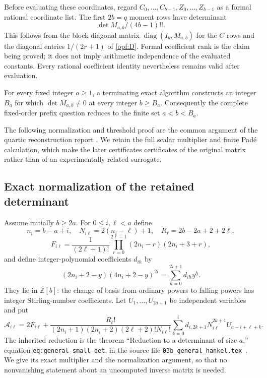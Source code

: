 Before evaluating these coordinates, regard
$C_0,\ldots,C_{b-1},Z_0,\ldots,Z_{b-1}$ as a formal rational
coordinate list. The first $2b=q$ moment rows have determinant
\begin{equation}\label{opf:prefix-determinant}
 \det M_{a,b}/(4b-1)!!.
\end{equation}
This follows from the block diagonal matrix $\operatorname{diag}(I_b,M_{a,b})$
for the $C$ rows and the diagonal entries $1/(2r+1)$ of
\eqref{opf:D}. Formal coefficient rank is the claim being proved;
it does not imply arithmetic independence of the evaluated constants.
Every rational coefficient identity nevertheless remains valid after
evaluation.

\begin{theorem}\label{opf:main}
For every fixed integer $a\ge1$, a terminating exact algorithm
constructs an integer $B_a$ for which $\det M_{a,b}\ne0$ at every
integer $b\ge B_a$. Consequently the complete fixed-order prefix
question reduces to the finite set $a<b<B_a$.
\end{theorem}

The following normalization and threshold proof are the common
argument of the quartic reconstruction report \cite{opf:reports}.
We retain the full scalar multiplier and finite Pad\'e calculation,
which make the later certificates certificates of the original
matrix rather than of an experimentally related surrogate.

\subsection{Exact normalization of the retained determinant}

Assume initially $b\ge2a$. For $0\le i,\ell<a$ define
\[
 n_i=b-a+i,\quad N_{i\ell}=2(n_i-\ell)+1,\quad
 R_\ell=2b-2a+2+2\ell,
\]
\[
 F_{i\ell}=\frac1{(2\ell+1)!}
 \prod_{r=0}^{2\ell-1}(2n_i-r)(2n_i+3+r),
\]
and define integer-polynomial coefficients $d_{ih}$ by
\begin{equation}\label{opf:newton}
 (2n_i+2-y)(4n_i+2-y)^{\underline{2i}}
       =\sum_{h=0}^{2i+1}d_{ih}y^{\underline h}.
\end{equation}
They lie in $\mathbb Z[b]$: the change of basis from ordinary
powers to falling powers has integer Stirling-number coefficients.
Let $U_1,\ldots,U_{2a-1}$ be independent variables and put
\begin{equation}\label{opf:A}
 \mathcal A_{i\ell}=2F_{i\ell}+
 \frac{R_\ell!}
 {(2n_i+1)(2n_i+2)(2\ell+2)!N_{i\ell}!}
 \sum_{k=0}^{i}d_{i,2k+1}N_{i\ell}^{\underline{2k+1}}
            U_{a-i+\ell+k}.
\end{equation}
The inherited reduction is the theorem ``Reduction to a determinant
of size $a$,'' equation \texttt{eq:general-small-det}, in the source
file \texttt{03b\_general\_hankel.tex}~\cite{dpm:reports,opf:reports}.
We give its exact multiplier and the normalization argument, so
that no nonvanishing statement about an uncomputed inverse matrix
is needed.

